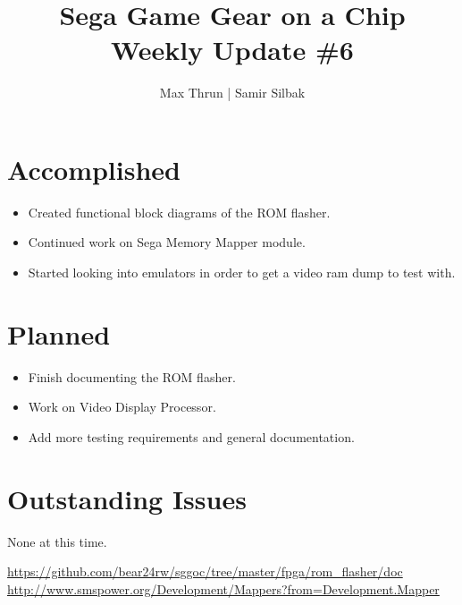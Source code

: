 \documentclass[12pt]{article}
\title{Sega Game Gear on a Chip \\ Weekly Update \#6}
\author{ Max Thrun | Samir Silbak }
\begin{document}
\maketitle

\section*{Accomplished}
\begin{itemize}
    \item Created functional block diagrams of the ROM flasher. \cite{flasher}
    \item Continued work on Sega Memory Mapper module. \cite{mapper}
    \item Started looking into emulators in order to get a video ram dump to test with.
\end{itemize}

\section*{Planned}
\begin{itemize}
    \item Finish documenting the ROM flasher.
    \item Work on Video Display Processor.
    \item Add more testing requirements and general documentation.
\end{itemize}

\section*{Outstanding Issues}
None at this time.

\vspace{.1in}
\begin{thebibliography}{9}
     \url{https://github.com/bear24rw/sggoc/tree/master/fpga/rom_flasher/doc}
     \url{http://www.smspower.org/Development/Mappers?from=Development.Mapper}
\end{thebibliography}
\end{document}

